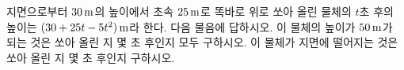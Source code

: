 지면으로부터 $30\mkern3mu \mathrm{m}$의 높이에서 초속 $25\mkern3mu \mathrm{m}$로 똑바로 위로 쏘아 올린 물체의 $t$초 후의 높이는 $(30+25t-5t^2)\mkern3mu \mathrm{m}$라 한다. 다음 물음에 답하시오.
 이 물체의 높이가 $50\mkern3mu \mathrm{m}$가 되는 것은 쏘아 올린 지 몇 초 후인지 모두 구하시오.
 이 물체가 지면에 떨어지는 것은 쏘아 올린 지 몇 초 후인지 구하시오.
